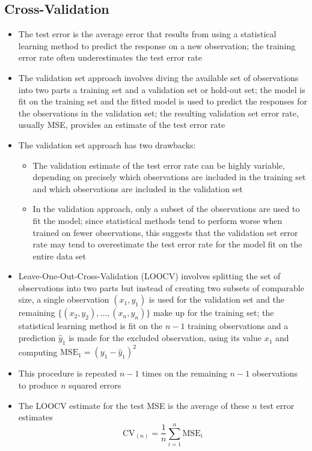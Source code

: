 \documentclass[12pt]{article}
\begin{document}
\subsection{Cross-Validation} 
\begin{itemize} 
\item The test error is the average error that results from using a statistical learning method to predict the response on a new observation; the training error rate often underestimates the test error rate
\item The validation set approach involves diving the available set of observations into two parts a training set and a validation set or hold-out set; the model is fit on the training set and the fitted model is used to predict the responses for the observations in the validation set; the resulting validation set error rate, usually MSE, provides an estimate of the test error rate 
\item The validation set approach has two drawbacks: \begin{itemize} 
\item The validation estimate of the test error rate can be highly variable, depending on precisely which observations are included in the training set and which observations are included in the validation set 
\item In the validation approach, only a subset of the observations are used to fit the model; since statistical methods tend to perform worse when trained on fewer observations, this suggests that the validation set error rate may tend to overestimate the test error rate for the model fit on the entire data set \end{itemize} 
\item Leave-One-Out-Cross-Validation (LOOCV) involves splitting the set of observations into two parts but instead of creating two subsets of comparable size, a single observation $(x_1,y_1)$ is used for the validation set and the remaining $\{(x_2,y_2),\dots,(x_n,y_n)\}$ make up for the training set; the statistical learning method is fit on the $n-1$ training observations and a prediction $\hat{y}_1$ is made for the excluded observation, using its value $x_1$ and computing $\text{MSE}_1 = (y_1 - \hat{y}_1)^2$ 
\item This procedure is repeated $n-1$ times on the remaining $n-1$ observations to produce $n$ squared errors
\item The LOOCV estimate for the test MSE is the average of these $n$ test error estimates $$ \text{CV}_{(n)} = \frac{1}{n}\sum_{i=1}^n \text{MSE}_i $$ 

\end{itemize}
\end{document}
